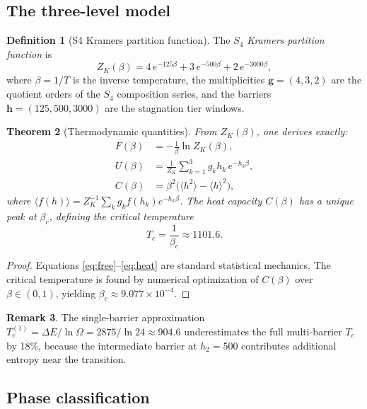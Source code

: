 \documentclass[11pt]{amsart}
\newtheorem{theorem}{Theorem}[section]
\theoremstyle{definition}
\newtheorem{definition}[theorem]{Definition}
\newtheorem{remark}[theorem]{Remark}
\begin{document}
\subsection{The three-level model}

\begin{definition}[S4 Kramers partition function]
The \emph{$S_4$ Kramers partition function} is
\begin{equation}\label{eq:zk}
Z_K(\beta) = 4\,e^{-125\beta} + 3\,e^{-500\beta} + 2\,e^{-3000\beta},
\end{equation}
where $\beta = 1/T$ is the inverse temperature, the multiplicities $\mathbf{g} = (4, 3, 2)$ are the quotient orders of the $S_4$ composition series, and the barriers $\mathbf{h} = (125, 500, 3000)$ are the stagnation tier windows.
\end{definition}

\begin{theorem}[Thermodynamic quantities]\label{thm:thermo}
From $Z_K(\beta)$, one derives exactly:
\begin{align}
F(\beta) &= -\frac{1}{\beta}\ln Z_K(\beta), \label{eq:free} \\
U(\beta) &= \frac{1}{Z_K} \sum_{k=1}^3 g_k h_k \, e^{-h_k \beta}, \label{eq:internal} \\
C(\beta) &= \beta^2 \bigl(\langle h^2 \rangle - \langle h \rangle^2\bigr), \label{eq:heat}
\end{align}
where $\langle f(h) \rangle = Z_K^{-1} \sum_k g_k f(h_k) e^{-h_k \beta}$. The heat capacity $C(\beta)$ has a unique peak at $\beta_c$, defining the critical temperature
\[
T_c = \frac{1}{\beta_c} \approx 1101.6.
\]
\end{theorem}

\begin{proof}
Equations \eqref{eq:free}--\eqref{eq:heat} are standard statistical mechanics. The critical temperature is found by numerical optimization of $C(\beta)$ over $\beta \in (0, 1)$, yielding $\beta_c \approx 9.077 \times 10^{-4}$.
\end{proof}

\begin{remark}
The single-barrier approximation $T_c^{(1)} = \Delta E / \ln \Omega = 2875 / \ln 24 \approx 904.6$ underestimates the full multi-barrier $T_c$ by 18\%, because the intermediate barrier at $h_2 = 500$ contributes additional entropy near the transition.
\end{remark}

\subsection{Phase classification}
\end{document}
